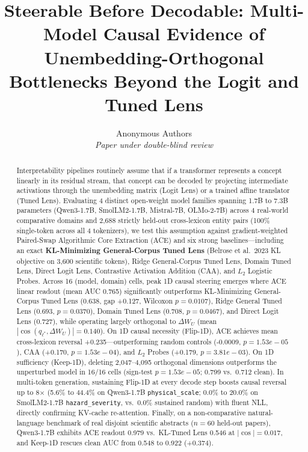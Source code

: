 \documentclass[10pt,twocolumn]{article}
\title{\Large\bfseries Steerable Before Decodable: Multi-Model Causal Evidence of Unembedding-Orthogonal Bottlenecks Beyond the Logit and Tuned Lens}
\author{Anonymous Authors \\ \textit{Paper under double-blind review}}
\date{}
\begin{document}
\maketitle
\begin{abstract}
Interpretability pipelines routinely assume that if a transformer represents a concept linearly in its residual stream, that concept can be decoded by projecting intermediate activations through the unembedding matrix (Logit Lens) or a trained affine translator (Tuned Lens). Evaluating 4 distinct open-weight model families spanning 1.7B to 7.3B parameters (Qwen3-1.7B, SmolLM2-1.7B, Mistral-7B, OLMo-2-7B) across 4 real-world comparative domains and 2,688 strictly held-out cross-lexicon entity pairs (100\% single-token across all 4 tokenizers), we test this assumption against gradient-weighted Paired-Swap Algorithmic Core Extraction (ACE) and six strong baselines---including an exact \textbf{KL-Minimizing General-Corpus Tuned Lens} (Belrose et al.\ 2023 KL objective on 3,600 scientific tokens), Ridge General-Corpus Tuned Lens, Domain Tuned Lens, Direct Logit Lens, Contrastive Activation Addition (CAA), and $L_2$ Logistic Probes. Across 16 (model, domain) cells, peak 1D causal steering emerges where ACE linear readout (mean AUC 0.765) significantly outperforms KL-Minimizing General-Corpus Tuned Lens (0.638, gap +0.127, Wilcoxon $p=0.0107$), Ridge General Tuned Lens (0.693, $p=0.0370$), Domain Tuned Lens (0.708, $p=0.0467$), and Direct Logit Lens (0.727), while operating largely orthogonal to $\Delta W_U$ (mean $|\cos(q_{\ell^*}, \Delta W_U)| = 0.140$). On 1D causal necessity (Flip-1D), ACE achieves mean cross-lexicon reversal +0.235---outperforming random controls (-0.0009, $p=1.53e-05$), CAA (+0.170, $p=1.53e-04$), and $L_2$ Probes (+0.179, $p=3.81e-03$). On 1D sufficiency (Keep-1D), deleting 2,047--4,095 orthogonal dimensions outperforms the unperturbed model in 16/16 cells (sign-test $p=1.53e-05$; 0.799 vs.\ 0.712 clean). In multi-token generation, sustaining Flip-1D at every decode step boosts causal reversal up to 8$\times$ (5.6\% to 44.4\% on Qwen3-1.7B \texttt{physical\_scale}; 0.0\% to 20.0\% on SmolLM2-1.7B \texttt{hazard\_severity}, vs.\ 0.0\% sustained random) with fluent NLL, directly confirming KV-cache re-attention. Finally, on a non-comparative natural-language benchmark of real disjoint scientific abstracts ($n=60$ held-out papers), Qwen3-1.7B exhibits ACE readout 0.979 vs.\ KL-Tuned Lens 0.546 at $|\cos|=0.017$, and Keep-1D rescues clean AUC from 0.548 to 0.922 (+0.374).
\end{abstract}
\end{document}
